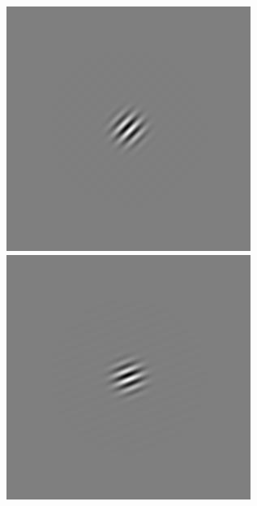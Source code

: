 \begin{figure}[ht]
\begin{center}
 \includegraphics[width=\columnwidth/9]{ch4/figures/iGabor2_2.jpg}
 \includegraphics[width=\columnwidth/9]{ch4/figures/iGabor2_3.jpg}

\end{center}
\end{figure}
